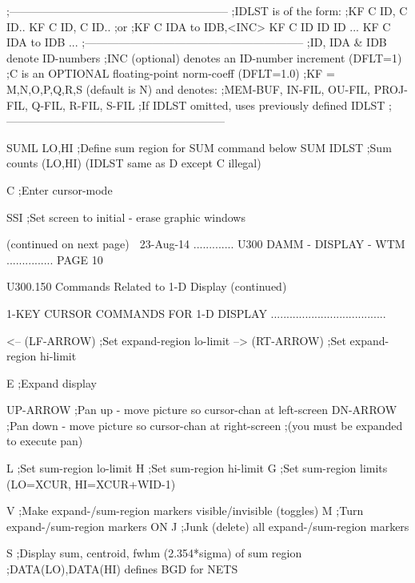                   ;-----------------------------------------------------------
                  ;IDLST is of the form:
                  ;KF C ID, C ID.. KF C ID, C ID..
                  ;or
                  ;KF C IDA to IDB,<INC> KF C ID ID ID ... KF C IDA to IDB ...
                  ;-----------------------------------------------------------
                  ;ID, IDA & IDB denote ID-numbers
                  ;INC (optional) denotes an ID-number increment (DFLT=1)
                  ;C is an OPTIONAL floating-point norm-coeff (DFLT=1.0)
                  ;KF = M,N,O,P,Q,R,S (default is N) and denotes:
                  ;MEM-BUF, IN-FIL, OU-FIL, PROJ-FIL, Q-FIL, R-FIL, S-FIL
                  ;If IDLST omitted, uses previously defined IDLST
                  ;-----------------------------------------------------------
 
   SUML LO,HI     ;Define sum region for SUM command below
   SUM  IDLST     ;Sum counts (LO,HI) (IDLST same as D except C illegal)
 
   C              ;Enter cursor-mode
 
   SSI            ;Set screen to initial - erase graphic windows
 
                            (continued on next page)
    
   23-Aug-14 ............. U300  DAMM - DISPLAY - WTM ............... PAGE  10
 
 
   U300.150  Commands Related to 1-D Display (continued)
 
 
   1-KEY CURSOR COMMANDS FOR 1-D DISPLAY .....................................
 
   <-- (LF-ARROW) ;Set expand-region lo-limit
   --> (RT-ARROW) ;Set expand-region hi-limit
 
   E              ;Expand display
 
   UP-ARROW       ;Pan up   - move picture so cursor-chan at  left-screen
   DN-ARROW       ;Pan down - move picture so cursor-chan at right-screen
                  ;(you must be expanded to execute pan)
 
   L              ;Set sum-region lo-limit
   H              ;Set sum-region hi-limit
   G              ;Set sum-region limits (LO=XCUR, HI=XCUR+WID-1)
 
   V              ;Make expand-/sum-region markers visible/invisible (toggles)
   M              ;Turn expand-/sum-region markers ON
   J              ;Junk (delete) all expand-/sum-region markers
 
   S              ;Display sum, centroid, fwhm (2.354*sigma) of sum region
                  ;DATA(LO),DATA(HI) defines BGD for NETS
 
